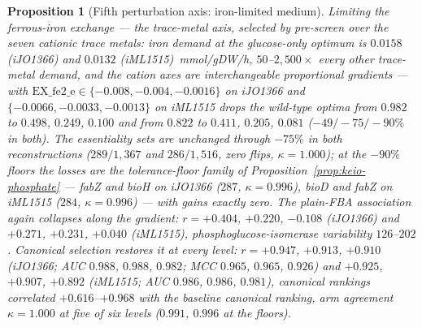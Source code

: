 \documentclass[11pt,a4paper]{article}
\theoremstyle{plain}
\newtheorem{proposition}[theorem]{Proposition}
\theoremstyle{definition}
\theoremstyle{remark}
\begin{document}
\begin{proposition}[Fifth perturbation axis: iron-limited medium]
\label{prop:keio-iron}
Limiting the ferrous-iron exchange --- the trace-metal axis,
selected by pre-screen over the seven cationic trace metals: iron
demand at the glucose-only optimum is $0.0158$ (iJO1366) and
$0.0132$ (iML1515)~mmol/gDW/h, $50$--$2{,}500\times$ every other
trace-metal demand, and the cation axes are interchangeable
proportional gradients --- with
$\mathrm{EX\_fe2\_e}\in\{-0.008,-0.004,-0.0016\}$ on iJO1366 and
$\{-0.0066,-0.0033,-0.0013\}$ on iML1515 drops the wild-type
optima from $0.982$ to $0.498$, $0.249$, $0.100$ and from $0.822$
to $0.411$, $0.205$, $0.081$ ($-49/-75/-90\%$ in both). The
essentiality sets are unchanged through $-75\%$ in both
reconstructions ($289/1{,}367$ and $286/1{,}516$, zero flips,
$\kappa=1.000$); at the $-90\%$ floors the losses are the
tolerance-floor family of
Proposition~\ref{prop:keio-phosphate} --- \emph{fabZ} and
\emph{bioH} on iJO1366 ($287$, $\kappa=0.996$), \emph{bioD} and
\emph{fabZ} on iML1515 ($284$, $\kappa=0.996$) --- with gains
exactly zero. The plain-FBA association again collapses along the
gradient: $r=+0.404$, $+0.220$, $-0.108$ (iJO1366) and $+0.271$,
$+0.231$, $+0.040$ (iML1515), phosphoglucose-isomerase variability
$126$--$202$. Canonical selection restores it at every level:
$r=+0.947$, $+0.913$, $+0.910$ (iJO1366; AUC $0.988$, $0.988$,
$0.982$; MCC $0.965$, $0.965$, $0.926$) and $+0.925$, $+0.907$,
$+0.892$ (iML1515; AUC $0.986$, $0.986$, $0.981$), canonical
rankings correlated $+0.616$--$+0.968$ with the baseline canonical
ranking, arm agreement $\kappa=1.000$ at five of six levels
($0.991$, $0.996$ at the floors).
\end{proposition}
\end{document}
